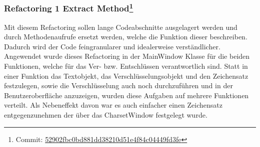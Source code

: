 \documentclass[12pt]{article}
\begin{document}
\subsubsection[Refactoring 1 Extract Method]{Refactoring 1 Extract Method\protect\footnote{Commit: \href{https://github.com/NicoSchrodt/EncryptionService/commit/52902fbc0bd881dd38210d51e4f84c04449fd3fe}{52902fbc0bd881dd38210d51e4f84c04449fd3fe}}}
Mit diesem Refactoring sollen lange Codeabschnitte ausgelagert werden und durch Methodenaufrufe ersetzt werden, welche die Funktion dieser beschreiben. Dadurch wird der Code feingranularer und idealerweise verständlicher. Angewendet wurde dieses Refactoring in der MainWindow Klasse für die beiden Funktionen, welche für das Ver- bzw. Entschlüssen verantwortlich sind. Statt in einer Funktion das Textobjekt, das Verschlüsselungsobjekt und den Zeichensatz festzulegen, sowie die Verschlüsselung auch noch durchzuführen und in der Benutzeroberfläche anzuzeigen, wurden diese Aufgaben auf mehrere Funktionen verteilt. Als Nebeneffekt davon war es auch einfacher einen Zeichensatz entgegenzunehmen der über das CharsetWindow festgelegt wurde.
\end{document}
